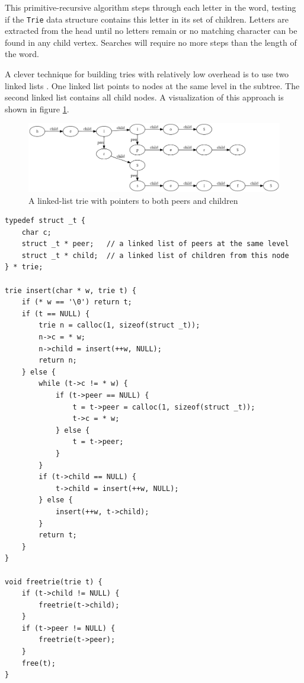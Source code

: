\documentclass{book}
\begin{document}
This primitive-recursive algorithm steps through each letter in the word, testing if the \texttt{Trie} data structure contains this letter in its set of children. Letters are extracted from the head until no letters remain or no matching character can be found in any child vertex. Searches will require no more steps than the length of the word.

A clever technique for building tries with relatively low overhead is to use two linked lists \cite{pitts_trie}. One linked list points to nodes at the same level in the subtree. The second linked list contains all child nodes. A visualization of this approach is shown in figure \ref{trie_in_c}.

\begin{figure}[ht]
\centering
\includegraphics[width=5in]{ch-trie/hello_helper_her_herself_as_trie_in_c}
\caption{A linked-list trie with pointers to both peers and children}
\label{trie_in_c}
\end{figure}

\begin{lstlisting}
typedef struct _t {
    char c;
    struct _t * peer;   // a linked list of peers at the same level
    struct _t * child;  // a linked list of children from this node
} * trie;

trie insert(char * w, trie t) {
    if (* w == '\0') return t;
    if (t == NULL) {
        trie n = calloc(1, sizeof(struct _t));
        n->c = * w;
        n->child = insert(++w, NULL);
        return n;
    } else {
        while (t->c != * w) {
            if (t->peer == NULL) {
                t = t->peer = calloc(1, sizeof(struct _t));
                t->c = * w;
            } else {
                t = t->peer;
            }
        }
        if (t->child == NULL) {
            t->child = insert(++w, NULL);
        } else {
            insert(++w, t->child);
        }
        return t;
    }
}

void freetrie(trie t) {
    if (t->child != NULL) {
        freetrie(t->child);
    }
    if (t->peer != NULL) {
        freetrie(t->peer);
    }
    free(t);
}
\end{lstlisting}
\end{document}
